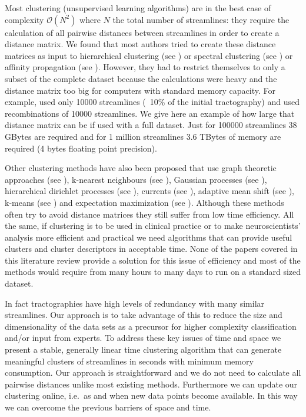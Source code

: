 \documentclass{bioinfo}
\begin{document}
Most clustering (unsupervised learning algorithms) are in the best case
of complexity $\mathcal{O}(N^2)$ where $N$ the total number of
streamlines: they require the calculation of all pairwise distances
between streamlines in order to create a distance matrix. We found that
most authors tried to create these distance matrices as input to
hierarchical clustering (see \citet{ moberts2005evaluation,
  zhang2005dti, Tsai2007, zhang2008identifying, jianu2009exploring,
  Visser2010, Guevara2010, Guevara12}) or spectral clustering (see
\citet{ODonnell_IEEETMI07, o2009tract, jonasson2005fiber,
  ziyan2009consistency}) or affinity propagation (see
\citet{leemans17new, malcolm2009filtered}). However, they had to
restrict themselves to only a subset of the complete dataset because the
calculations were heavy and the distance matrix too big for computers
with standard memory capacity. For example, \citet{ODonnell_IEEETMI07}
used only \num{10000} streamlines (~10\% of the initial tractography)
and \citet{Visser2010} used recombinations of \num{10000} streamlines.
We give here an example of how large that distance matrix can be if used
with a full dataset. Just for \num{100000} streamlines 38 GBytes are
required and for 1 million streamlines 3.6 TBytes of memory are required
(4 bytes floating point precision).

Other clustering methods have also been proposed that use graph
theoretic approaches (see \citet{brun2004clustering, gerig2004analysis,
  ElKouby2005}), k-nearest neighbours (see \citet{Ding2003a,
  moberts2005evaluation}), Gaussian processes (see
\citet{wassermann2010unsupervised}), hierarchical dirichlet processes
(see \citet{wang2010tractography}), currents (see \citet{Durrleman2009,
  durrleman2010registration}), adaptive mean shift (see
\citet{zvitia2008adaptive, Zvitia2010}), k-means (see
\citet{ElKouby2005}) and expectation maximization (see
\citet{Maddah_IEEEBI2008}). Although these methods often try to avoid
distance matrices they still suffer from low time efficiency. All the
same, if clustering is to be used in clinical practice or to make
neuroscientists' analysis more efficient and practical we need
algorithms that can provide useful clusters and cluster descriptors in
acceptable time. None of the papers covered in this literature review
provide a solution for this issue of efficiency and most of the methods
would require from many hours to many days to run on a standard sized
dataset.

In fact tractographies have high levels of redundancy with many similar
streamlines. Our approach is to take advantage of this to reduce the
size and dimensionality of the data sets as a precursor for higher
complexity classification and/or input from experts. To address these
key issues of time and space we present a stable, generally linear time
clustering algorithm that can generate meaningful clusters of
streamlines in seconds with minimum memory consumption. Our approach is
straightforward and we do not need to calculate all pairwise distances
unlike most existing methods. Furthermore we can update our clustering
online, i.e.~as and when new data points become available. In this way
we can overcome the previous barriers of space and time.
\end{document}
